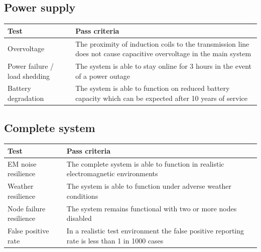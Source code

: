 \documentclass[12pt]{article}
\begin{document}
\subsection{Power supply}
\begin{center}
  \begin{table}[!htb]
    
    \hskip-2.2cm\begin{tabular}{|p{8cm}|p{10cm}|}
        \hline
        \textbf{Test} & \textbf{Pass criteria} \\
        \hline

        Overvoltage & The proximity of induction coils to the transmission line does not cause capacitive
        overvoltage in the main system \\[0.3cm]
        Power failure / load shedding & The system is able to stay online for 3 hours in the event of a power outage \\[0.3cm]
        Battery degradation & The system is able to function on reduced battery capacity which can be expected after 10 years of service \\[0.3cm]


        \hline

      \end{tabular}    
      
      \label{tab:summary_measurments}
     \end{table}
  \end{center}

\subsection{Complete system}
\begin{center}
  \begin{table}[!htb]
    
    \hskip-2.2cm\begin{tabular}{|p{8cm}|p{10cm}|}
        \hline
        \textbf{Test} & \textbf{Pass criteria} \\
        \hline

        EM noise resilience & The complete system is able to function in realistic electromagnetic environments\\[0.3cm]
        Weather resilience & The system is able to function under adverse weather conditions \\[0.3cm]
        Node failure resilience & The system remains functional with two or more nodes disabled \\[0.3cm]
        False positive rate & In a realistic test environment the false positive reporting rate is less than 1 in 1000 cases\\[0.3cm]


        \hline

      \end{tabular}    
      
      \label{tab:summary_measurments}
     \end{table}
  \end{center}
\end{document}
